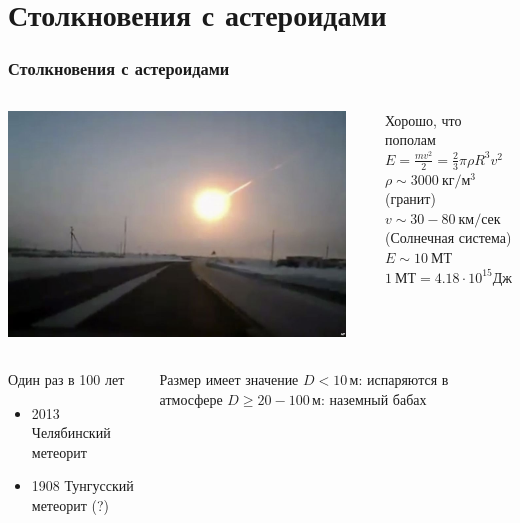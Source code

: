 \documentclass[aspectratio=169]{beamer}
\begin{document}
\section{Столкновения с астероидами}

\begin{frame}
\frametitle{Столкновения с астероидами}
\begin{columns}[T]
\includegraphics[width=0.95\textwidth]{img/chelyabinsk_meteor_2.jpg}
\begin{block}{Хорошо, что пополам}
$E = \frac{m v^2}{2} = \frac{2}{3} \pi \rho R^3 v^2$ \\
$\rho \sim 3000 \: \mathrm{\text{кг}/\text{м}^3}$ {\small (гранит)} \\
$v \sim 30 - 80 \: \mathrm{\text{км}/\text{сек}}$ {\small (Солнечная система)} \\
{\Large \color{red} $E \sim 10 \: \mathrm{\text{МТ}}$} \\
$1 \: \mathrm{\text{МТ}} = 4.18 \cdot 10^{15} \mathrm{\text{Дж}}$
\end{block}
\end{columns}
\begin{columns}[c]
\begin{block}{Один раз в 100 лет}
\begin{itemize}
\item 2013 Челябинский метеорит
\item 1908 Тунгусский метеорит (?)
\end{itemize}
\end{block}
\begin{block}{Размер имеет значение}
$D < 10 \, \mathrm{\text{м}}$: испаряются в атмосфере
$D \geq 20 - 100 \, \mathrm{\text{м}}$: наземный бабах
\end{block}
\end{columns}
\end{frame}
\end{document}
